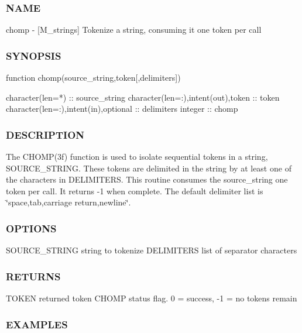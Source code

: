 \subsubsection*{N\+A\+ME}

chomp -\/ \mbox{[}M\+\_\+strings\mbox{]} Tokenize a string, consuming it one token per call 

\subsubsection*{S\+Y\+N\+O\+P\+S\+IS}

\begin{DoxyVerb}function chomp(source_string,token[,delimiters])

 character(len=*)                     :: source_string
 character(len=:),intent(out),token   :: token
 character(len=:),intent(in),optional :: delimiters
 integer                              :: chomp
\end{DoxyVerb}


\subsubsection*{D\+E\+S\+C\+R\+I\+P\+T\+I\+ON}

The C\+H\+O\+M\+P(3f) function is used to isolate sequential tokens in a string, S\+O\+U\+R\+C\+E\+\_\+\+S\+T\+R\+I\+NG. These tokens are delimited in the string by at least one of the characters in D\+E\+L\+I\+M\+I\+T\+E\+RS. This routine consumes the source\+\_\+string one token per call. It returns -\/1 when complete. The default delimiter list is \char`\"{}space,tab,carriage return,newline\char`\"{}.

\subsubsection*{O\+P\+T\+I\+O\+NS}

S\+O\+U\+R\+C\+E\+\_\+\+S\+T\+R\+I\+NG string to tokenize D\+E\+L\+I\+M\+I\+T\+E\+RS list of separator characters

\subsubsection*{R\+E\+T\+U\+R\+NS}

T\+O\+K\+EN returned token C\+H\+O\+MP status flag. 0 = success, -\/1 = no tokens remain

\subsubsection*{E\+X\+A\+M\+P\+L\+ES}

